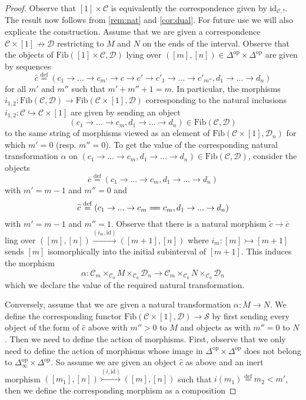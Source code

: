 \documentclass[a4paper, reqno]{amsart}
\theoremstyle{definition}
\newcommand\cC{\mathscr C}
\newcommand\cD{\mathscr D}
\newcommand\cS{\mathscr S}
\newcommand\id{\mathrm{id}}
\newcommand\op{\mathrm{op}}
\newcommand\bydef{\overset{\mathrm{def}}{=}}
\newcommand\fib{\mathrm{Fib}}
\begin{document}
\begin{proof}
Observe that $[1]\times \cC$ is equivalently the correspondence given by $\id_{\cC,!}$. The result now follows from \cref{rem:nat} and \cref{cor:dual}. For future use we will also explicate the construction. Assume that we are given a correspondence $\cC\times[1]\nrightarrow\cD$ restricting to $M$ and $N$ on the ends of the interval. Observe that the objects of $\fib([1]\times\cC,\cD)$ lying over $([m],[n])\in\Delta^\op\times\Delta^\op$ are given by sequences \[\widehat{c}\bydef(c_1\rightarrow...\rightarrow c_{m'}\rightarrow c\rightarrow c'\rightarrow c'_1\rightarrow...\rightarrow c'_{m''},d_1\rightarrow...\rightarrow d_n)\] for all $m'$ and $m''$ such that $m'+m''+1=m$. In particular, the morphisms $i_{1,2}:\fib(\cC,\cD)\rightarrow\fib(\cC\times[1],\cD)$ corresponding to the natural inclusions $i_{1,2}:\cC\hookrightarrow\cC\times [1]$ are given by sending an object \[(c_1\rightarrow...\rightarrow c_m,d_1\rightarrow...\rightarrow d_n)\in\fib(\cC,\cD)\]
to the same string of morphisms viewed as an element of $\fib(\cC\times[1],\cD_n)$ for which $m'=0$ (resp. $m''=0$). To get the value of the corresponding natural transformation $\alpha$ on $(c_1\rightarrow...\rightarrow c_m,d_1\rightarrow...\rightarrow d_n)\in\fib(\cC,\cD)$, consider the objects \[\overline{c}\bydef(c_1\rightarrow...\rightarrow c_m,d_1\rightarrow...\rightarrow d_n)\]
with $m'=m-1$ and $m''=0$ and 
\[\widetilde{c}\bydef(c_1\rightarrow...\rightarrow c_m=\joinrel=c_m,d_1\rightarrow...\rightarrow d_n)\] 
with $m'=m-1$ and $m''=1$. Observe that there is a natural morphism $\widetilde{c}\rightarrow\overline{c}$ ling over $([m],[n])\xrightarrow{(i_m,\id)}([m+1],[n])$ where $i_m:[m]\rightarrowtail[m+1]$ sends $[m]$ isomorphically into the initial subinterval of $[m+1]$. This induces the morphism \[\alpha:\cC_m\times_{\cC_0}M\times_{\cC_0}\cD_n\rightarrow\cC_m\times_{\cC_0}N\times_{\cC_0}\cD_n\]
which we declare the value of the required natural transformation.\par
Conversely, assume that we are given a natural transformation $\alpha:M\rightarrow N$. We define the corresponding functor $\fib(\cC\times[1],\cD)\rightarrow\cS$ by first sending every object of the form of $\widehat{c}$ above with $m''>0$ to $M$ and objects as with $m''=0$ to $N$. Then we need to define the action of morphisms. First, observe that we only need to define the action of morphisms whose image in $\Delta^\op\times\Delta^\op$ does not belong to $\Delta^\op_\infty\times\Delta^\op$. So assume we are given an object $\widehat{c}$ as above and an inert morphism $([m_1],[n])\overset{(i,\id)}{\rightarrowtail}([m],[n])$ such that $i(m_1)\bydef m_2<m'$, then we define the corresponding morphism as a composition

\end{proof}
\end{document}
